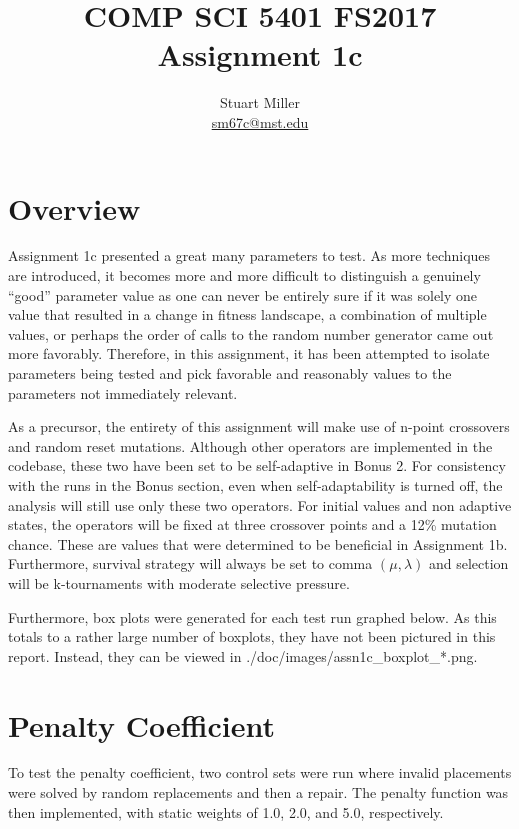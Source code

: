 \documentclass[11pt]{article}
\begin{document}
\title{COMP SCI 5401 FS2017 Assignment 1c}
\author{Stuart Miller\\\href{mailto:sm67c@mst.edu}{sm67c@mst.edu}}
\maketitle


\section{Overview}\label{sect:overview}

Assignment 1c presented a great many parameters to test. As more techniques are introduced, it becomes more and more difficult to distinguish a genuinely "`good"' parameter value as one can never be entirely sure if it was solely one value that resulted in a change in fitness landscape, a combination of multiple values, or perhaps the order of calls to the random number generator came out more favorably. Therefore, in this assignment, it has been attempted to isolate parameters being tested and pick favorable and reasonably values to the parameters not immediately relevant.

As a precursor, the entirety of this assignment will make use of n-point crossovers and random reset mutations. Although other operators are implemented in the codebase, these two have been set to be self-adaptive in Bonus 2. For consistency with the runs in the Bonus section, even when self-adaptability is turned off, the analysis will still use only these two operators. For initial values and non adaptive states, the operators will be fixed at three crossover points and a 12\% mutation chance. These are values that were determined to be beneficial in Assignment 1b. Furthermore, survival strategy will always be set to comma \((\mu,\lambda)\) and selection will be k-tournaments with moderate selective pressure.

Furthermore, box plots were generated for each test run graphed below. As this totals to a rather large number of boxplots, they have not been pictured in this report. Instead, they can be viewed in ./doc/images/assn1c\_boxplot\_*.png.


\section{Penalty Coefficient}\label{sect:penalty}

To test the penalty coefficient, two control sets were run where invalid placements were solved by random replacements and then a repair. The penalty function was then implemented, with static weights of 1.0, 2.0, and 5.0, respectively.
\end{document}
